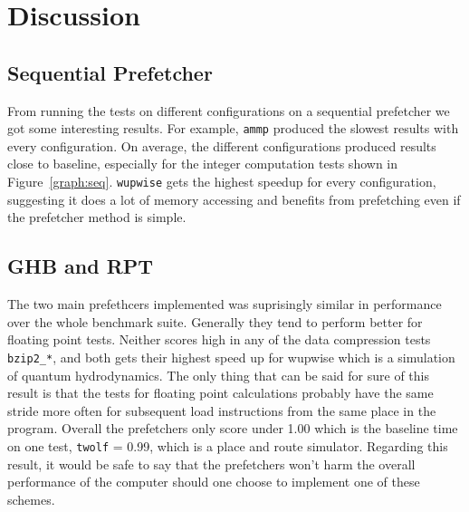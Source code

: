 \section{Discussion} %


\subsection{Sequential Prefetcher}

From running the tests on different configurations on a sequential
prefetcher we got some interesting results. For example, \texttt{ammp}
produced the slowest results with every configuration. On average, the
different configurations produced results close to baseline,
especially for the integer computation tests shown in
Figure~\ref{graph:seq}. \texttt{wupwise} gets the highest speedup for
every configuration, suggesting it does a lot of memory accessing and
benefits from prefetching even if the prefetcher method is simple.

\subsection{GHB and RPT}
The two main prefethcers implemented was suprisingly similar in
performance over the whole benchmark suite. Generally they tend to
perform better for floating point tests. Neither scores high in any of
the data compression tests \texttt{bzip2\_*}, and both gets their
highest speed up for wupwise which is a simulation of quantum
hydrodynamics. The only thing that can be said for sure of this result
is that the tests for floating point calculations probably have the
same stride more often for subsequent load instructions from the same
place in the program. Overall the prefetchers only score under 1.00
which is the baseline time on one test,  \texttt{twolf} = 0.99, which is a
place and route simulator. Regarding this result, it would be safe to
say that the prefetchers won't harm the overall performance of the
computer should one choose to implement one of these schemes. 
